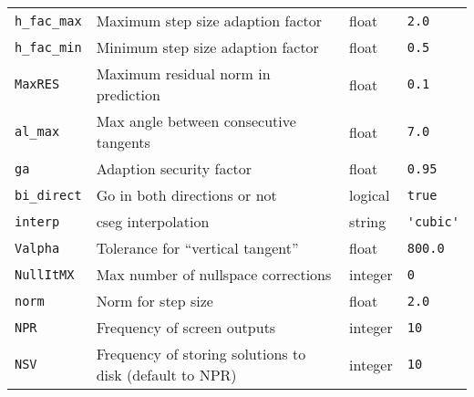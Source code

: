 \documentclass[11pt]{article}
\begin{document}
\begin{table}[h]
\begin{tabular}{l|l|l|l}
    \verb!h_fac_max! & Maximum step size adaption factor                                                                                    & float               & \verb!2.0!             \\[1ex]
    \verb!h_fac_min! & Minimum step size adaption factor                                                                                    & float               & \verb!0.5!             \\[1ex]
    \verb!MaxRES!    & Maximum residual norm in prediction                                                                                  & float               & \verb!0.1!             \\[1ex]
    \verb!al_max!    & Max angle between consecutive tangents                                                                               & float               & \verb!7.0!             \\[1ex]
    \verb!ga!        & Adaption security factor                                                                                             & float               & \verb!0.95!            \\[1ex]
    \verb!bi_direct! & Go in both directions or not                                                                                         & logical             & \verb!true!            \\[1ex]
    \verb!interp!    & cseg interpolation                                                                                                   & string              & \verb!'cubic'!         \\[1ex]
    \verb!Valpha!    & Tolerance for ``vertical tangent''                                                                                   & float               & \verb!800.0!           \\[1ex]
    \verb!NullItMX!  & Max number of nullspace corrections                                                                                  & integer             & \verb!0!               \\[1ex]
    \verb!norm!      & Norm for step size                                                                                                   & float               & \verb!2.0!             \\[1ex]
    \verb!NPR!       & Frequency of screen outputs                                                                                          & integer             & \verb!10!              \\[1ex]
    \verb!NSV!       & Frequency of storing solutions to disk (default to NPR)                                                              & integer             & \verb!10!              \\[1ex]

\end{tabular}
\end{table}
\end{document}
